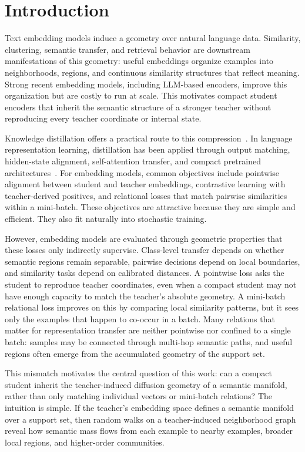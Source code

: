 \section{Introduction}

Text embedding models induce a geometry over natural language data. Similarity, clustering, semantic transfer, and retrieval behavior are downstream manifestations of this geometry: useful embeddings organize examples into neighborhoods, regions, and continuous similarity structures that reflect meaning. Strong recent embedding models, including LLM-based encoders, improve this organization but are costly to run at scale. This motivates compact student encoders that inherit the semantic structure of a stronger teacher without reproducing every teacher coordinate or internal state.

Knowledge distillation offers a practical route to this compression~\citep{hinton2015distilling}. In language representation learning, distillation has been applied through output matching, hidden-state alignment, self-attention transfer, and compact pretrained architectures~\citep{sanh2019distilbert,jiao2019tinybert,wang2020minilm,xu2024survey}. For embedding models, common objectives include pointwise alignment between student and teacher embeddings, contrastive learning with teacher-derived positives, and relational losses that match pairwise similarities within a mini-batch. These objectives are attractive because they are simple and efficient. They also fit naturally into stochastic training.

However, embedding models are evaluated through geometric properties that these losses only indirectly supervise. Class-level transfer depends on whether semantic regions remain separable, pairwise decisions depend on local boundaries, and similarity tasks depend on calibrated distances. A pointwise loss asks the student to reproduce teacher coordinates, even when a compact student may not have enough capacity to match the teacher's absolute geometry. A mini-batch relational loss improves on this by comparing local similarity patterns, but it sees only the examples that happen to co-occur in a batch. Many relations that matter for representation transfer are neither pointwise nor confined to a single batch: samples may be connected through multi-hop semantic paths, and useful regions often emerge from the accumulated geometry of the support set.

This mismatch motivates the central question of this work: can a compact student inherit the teacher-induced diffusion geometry of a semantic manifold, rather than only matching individual vectors or mini-batch relations? The intuition is simple. If the teacher's embedding space defines a semantic manifold over a support set, then random walks on a teacher-induced neighborhood graph reveal how semantic mass flows from each example to nearby examples, broader local regions, and higher-order communities.

